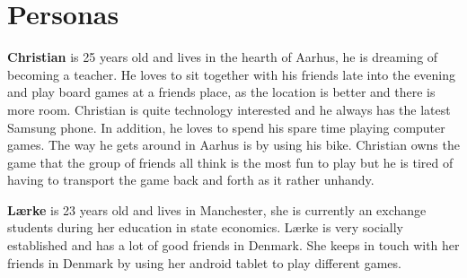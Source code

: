 \section{Personas}
\textbf{Christian} is 25 years old and lives in the hearth of Aarhus, he is dreaming of becoming a teacher. He loves to sit together with his friends late into the evening and play board games at a friends place, as the location is better and there is more room. Christian is quite technology interested and he always has the latest Samsung phone. In addition, he loves to spend his spare time playing computer games. The way he gets around in Aarhus is by using his bike. Christian owns the game that the group of friends all think is the most fun to play but he is tired of having to transport the game back and forth as it rather unhandy.

\textbf{Lærke} is 23 years old and lives in Manchester, she is currently an exchange students during her education in state economics. Lærke is very socially established and has a lot of good friends in Denmark. She keeps in touch with her friends in Denmark by using her android tablet to play different games.